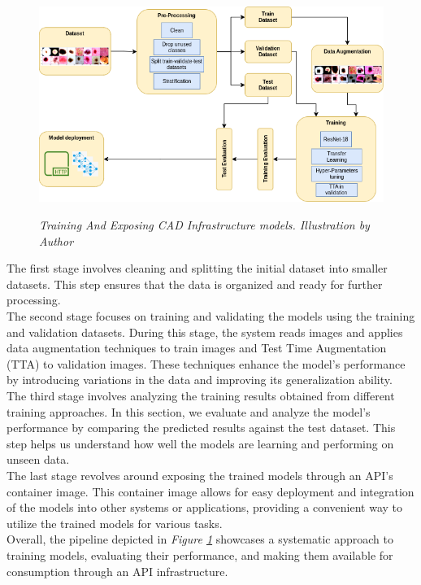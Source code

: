 \begin{figure}[H]
  \centering
  \includegraphics[width=\textwidth]{imatges/methodological_contribution/Pipeline.drawio.png}
  \caption[Training And Exposing CAD Infrastructure models]{\textit{Training And Exposing CAD Infrastructure models. Illustration by Author}}
  {\label{fig:cad-infrastructure-training-system}}
\end{figure}

The first stage involves cleaning and splitting the initial dataset into
smaller datasets. This step ensures that the data is organized and ready for
further processing. \\

The second stage focuses on training and validating the models using the
training and validation datasets. During this stage, the system reads images
and applies data augmentation techniques to train images and Test Time
Augmentation (TTA) to validation images. These techniques enhance the model's
performance by introducing variations in the data and improving its
generalization ability. \\

The third stage involves analyzing the training results obtained from different
training approaches. In this section, we evaluate and analyze the model's
performance by comparing the predicted results against the test dataset. This
step helps us understand how well the models are learning and performing on
unseen data. \\

The last stage revolves around exposing the trained models through an API's
container image. This container image allows for easy deployment and
integration of the models into other systems or applications, providing a
convenient way to utilize the trained models for various tasks. \\

Overall, the pipeline depicted in \textit{Figure
\ref{fig:cad-infrastructure-training-system}} showcases a systematic approach
to training models, evaluating their performance, and making them available for
consumption through an API infrastructure.
